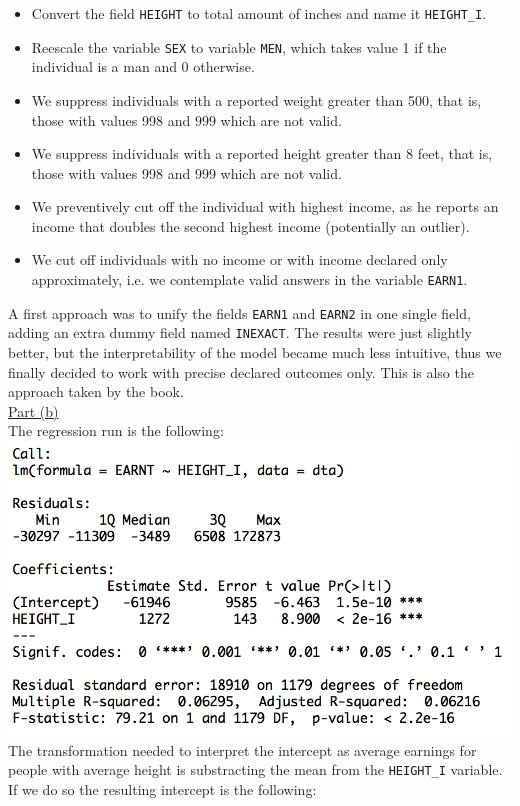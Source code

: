 \documentclass[a4paper, 11pt]{article}
\begin{document}
\begin{itemize}
\item Convert the field \texttt{HEIGHT} to total amount of inches and name it \texttt{HEIGHT\_I}.
\item Reescale the variable \texttt{SEX} to variable \texttt{MEN}, which takes value 1 if the individual is a man and 0 otherwise.
\item We suppress individuals with a reported weight greater than 500, that is, those with values 998 and 999 which are not valid.
\item We suppress individuals with a reported height greater than 8 feet, that is, those with values 998 and 999 which are not valid.
\item We preventively cut off the individual with highest income, as he reports an income that doubles the second highest income (potentially an outlier).
\item We cut off individuals with no income or with income declared only approximately, i.e. we contemplate valid answers in the variable \texttt{EARN1}.
\end{itemize}
A first approach was to unify the fields \texttt{EARN1} and \texttt{EARN2} in one single field, adding an extra dummy field named \texttt{INEXACT}. The results were just slightly better, but the interpretability of the model became much less intuitive, thus we finally decided to work with precise declared outcomes only. This is also the approach taken by the book.\\
\newline \underline{Part (b)}\\
\newline The regression run is the following:\\
\includegraphics[scale=0.7]{reg1.png}
\newline The transformation needed to interpret the intercept as average earnings for people with average height is substracting the mean from the \texttt{HEIGHT\_I} variable. If we do so the resulting intercept is the following:\\
\end{document}
